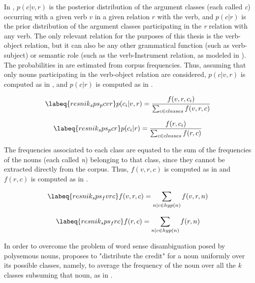 In , $p(c|v,r)$ is the posterior distribution of the argument classes (each called \textit{c}) occurring with a given verb $v$ in a given relation $r$ with the verb, and $p(c|r)$ is the prior distribution of the argument classes participating in the \textit{r} relation with any verb. The only relevant relation for the purposes of this thesis is the verb-object relation, but it can also be any other grammatical function (such as verb-subject) or semantic role (such as the verb-Instrument relation, as modeled in \textcite{CappelliLenciPISA}).\\
The probabilities in  are estimated from corpus frequencies. Thus, assuming that only nouns participating in the verb-object relation are considered, $p(c|v,r)$ is computed as in , and $p(c|r)$ is computed as in .

\begin{equation} \labeq{resnik_sps_pcvr}
p(c_i|v,r) = \frac{f(v,r,c_i)}{\sum_{c \in classes} f(v,r,c)}
\end{equation}

\begin{equation} \labeq{resnik_sps_pcr}
p(c_i|r) = \frac{f(r,c_i)}{\sum_{c \in classes} f(r,c)}
\end{equation}

The frequencies associated to each class are equated to the sum of the frequencies of the nouns (each called \textit{n}) belonging to that class, since they cannot be extracted directly from the corpus. Thus, $f(v,r,c)$ is computed as in  and $f(r,c)$ is computed as in .

\begin{equation} \labeq{resnik_sps_fvrc}
f(v,r,c) = \sum_{n|c \in hyp(n)} f(v,r,n)
\end{equation}

\begin{equation} \labeq{resnik_sps_frc}
f(r,c) = \sum_{n|c \in hyp(n)} f(r,n)
\end{equation}

In order to overcome the problem of word sense disambiguation posed by polysemous nouns, \textcite[28]{Resnik1993} proposes to "distribute the credit" for a noun uniformly over its possible classes, namely, to average the frequency of the noun over all the \textit{k} classes subsuming that noun, as in .


